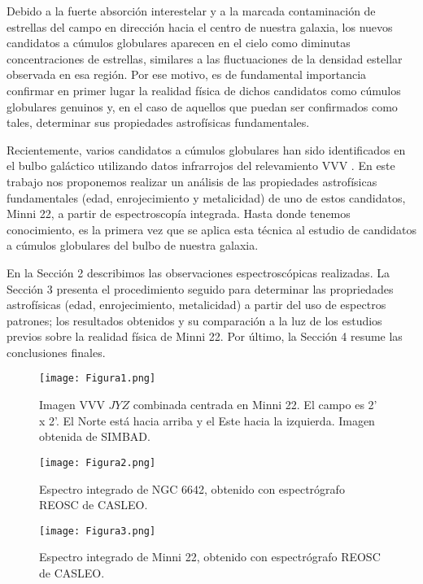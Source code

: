 \documentclass[baaa]{baaa}
\begin{document}
Debido a la fuerte absorción interestelar y a la marcada contaminación de estrellas del campo en dirección hacia el centro de nuestra galaxia, los nuevos candidatos a cúmulos globulares aparecen en el cielo como diminutas concentraciones de estrellas, similares a las fluctuaciones de la densidad estellar observada en esa región. Por ese motivo, es de fundamental importancia confirmar en primer lugar la realidad física de dichos candidatos como cúmulos globulares genuinos y, en el caso de aquellos que puedan ser confirmados como tales, determinar sus propiedades astrofísicas fundamentales.

 Recientemente, varios candidatos a cúmulos globulares han sido identificados en el bulbo galáctico utilizando datos infrarrojos del relevamiento VVV \citep{minniti-2017}. En este trabajo nos proponemos realizar un análisis de las propiedades astrofísicas fundamentales (edad, enrojecimiento y metalicidad) de uno de estos candidatos, Minni 22, a partir de espectroscopía integrada. Hasta donde tenemos conocimiento, es la primera vez que se aplica esta técnica al estudio de candidatos a cúmulos globulares del bulbo de nuestra galaxia.

En la Sección 2 describimos las observaciones espectroscópicas realizadas. La Sección 3 presenta el procedimiento seguido para determinar las propriedades astrofísicas (edad, enrojecimiento, metalicidad) a partir del uso de espectros patrones; los resultados obtenidos y su comparación a la luz de los estudios previos sobre la realidad física de Minni 22. Por último, la Sección 4 resume las conclusiones finales.

\begin{figure}
\centering
\texttt{[image: Figura1.png]}
\caption{Imagen VVV $JYZ$ combinada centrada en Minni 22. El campo es 2' x 2'. El Norte está hacia arriba y el Este hacia la izquierda. Imagen obtenida de SIMBAD.}
\label{Figura1}
\end{figure}


\begin{figure}
\centering
\texttt{[image: Figura2.png]}
\caption{Espectro integrado de NGC 6642, obtenido con espectrógrafo REOSC de CASLEO.}
\label{Figura2}
\end{figure}


\begin{figure}
\centering
\texttt{[image: Figura3.png]}
\caption{Espectro integrado de Minni 22, obtenido con espectrógrafo REOSC de CASLEO.}
\label{Figura3}
\end{figure}
\end{document}
